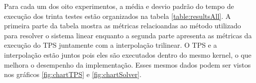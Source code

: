   Para cada um dos oito experimentos, a média e desvio padrão do tempo de
execução dos trinta testes estão organizados na tabela \ref{table:resultsAll}.
A primeira parte da tabela mostra as métricas relacioandas ao método utilizado
para resolver o sistema linear enquanto a segunda parte apresenta as métricas
da execução do TPS juntamente com a interpolação trilinear. O TPS e a interpolação
estão juntos pois eles são executados dentro do mesmo kernel, o que melhora o
desempenho da implementação. Esses mesmos dados podem ser vistos nos gráficos
\ref{fig:chartTPS} e \ref{fig:chartSolver}.

